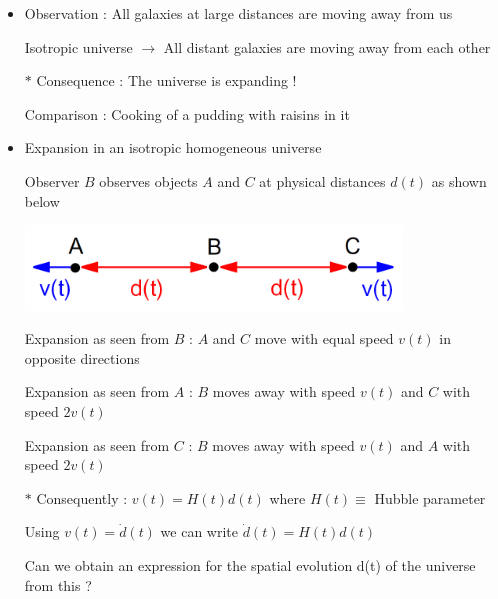 \onecolumn
\begin{itemize}
\item Observation : All galaxies at large distances are moving away from us
\item[] Isotropic universe $\rightarrow$ All distant galaxies are moving away from each other
\item[$\ast$] Consequence : {\blue The universe is expanding !}
\item[] Comparison : Cooking of a pudding with raisins in it 
\item Expansion in an isotropic homogeneous universe 
\item[] Observer $B$ observes objects $A$ and $C$ at physical distances $d(t)$ as shown below
\item[] \begin{center}
        \includegraphics[keepaspectratio,width=10cm]{abc}
        \end{center}
\item[] Expansion as seen from $B$ : $A$ and $C$ move with equal speed $v(t)$ in opposite directions
\item[] Expansion as seen from $A$ : $B$ moves away with speed $v(t)$ and $C$ with speed $2v(t)$
\item[] Expansion as seen from $C$ : $B$ moves away with speed $v(t)$ and $A$ with speed $2v(t)$
\item[$\ast$] Consequently : {\blue $v(t)=H(t)d(t)$} where {\blue $H(t) \equiv$ Hubble parameter}
\item[] Using $v(t)=\dot{d}(t)$ we can write {\red $\dot{d}(t)=H(t)d(t)$}
\item[] {\blue Can we obtain an expression for the spatial evolution d(t) of the universe from this ?}
\end{itemize}

